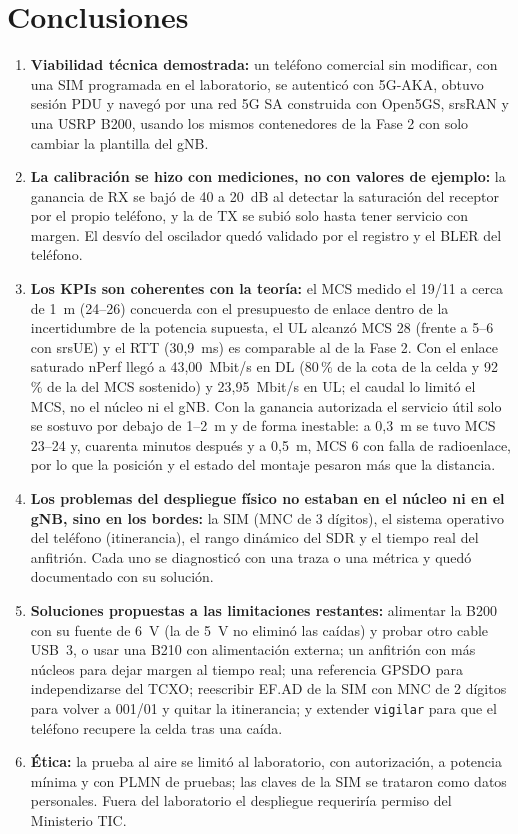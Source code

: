 \documentclass[conference]{IEEEtran}
\begin{document}
\section{Conclusiones}
\label{sec:concl}

\begin{enumerate}
  \item \textbf{Viabilidad técnica demostrada:} un teléfono comercial sin modificar, con una SIM programada en el laboratorio, se autenticó con 5G-AKA, obtuvo sesión PDU y navegó por una red 5G SA construida con Open5GS, srsRAN y una USRP B200, usando los mismos contenedores de la Fase 2 con solo cambiar la plantilla del gNB.
  \item \textbf{La calibración se hizo con mediciones, no con valores de ejemplo:} la ganancia de RX se bajó de 40 a 20~dB al detectar la saturación del receptor por el propio teléfono, y la de TX se subió solo hasta tener servicio con margen. El desvío del oscilador quedó validado por el registro y el BLER del teléfono.
  \item \textbf{Los KPIs son coherentes con la teoría:} el MCS medido el 19/11 a cerca de 1~m (24--26) concuerda con el presupuesto de enlace dentro de la incertidumbre de la potencia supuesta, el UL alcanzó MCS 28 (frente a 5--6 con srsUE) y el RTT (30{,}9~ms) es comparable al de la Fase 2. Con el enlace saturado nPerf llegó a 43{,}00~Mbit/s en DL (80\,\% de la cota de la celda y 92\,\% de la del MCS sostenido) y 23{,}95~Mbit/s en UL; el caudal lo limitó el MCS, no el núcleo ni el gNB. Con la ganancia autorizada el servicio útil solo se sostuvo por debajo de 1--2~m y de forma inestable: a 0{,}3~m se tuvo MCS 23--24 y, cuarenta minutos después y a 0{,}5~m, MCS 6 con falla de radioenlace, por lo que la posición y el estado del montaje pesaron más que la distancia.
  \item \textbf{Los problemas del despliegue físico no estaban en el núcleo ni en el gNB, sino en los bordes:} la SIM (MNC de 3 dígitos), el sistema operativo del teléfono (itinerancia), el rango dinámico del SDR y el tiempo real del anfitrión. Cada uno se diagnosticó con una traza o una métrica y quedó documentado con su solución.
  \item \textbf{Soluciones propuestas a las limitaciones restantes:} alimentar la B200 con su fuente de 6~V (la de 5~V no eliminó las caídas) y probar otro cable USB~3, o usar una B210 con alimentación externa; un anfitrión con más núcleos para dejar margen al tiempo real; una referencia GPSDO para independizarse del TCXO; reescribir EF.AD de la SIM con MNC de 2 dígitos para volver a 001/01 y quitar la itinerancia; y extender \texttt{vigilar} para que el teléfono recupere la celda tras una caída.
  \item \textbf{Ética:} la prueba al aire se limitó al laboratorio, con autorización, a potencia mínima y con PLMN de pruebas; las claves de la SIM se trataron como datos personales. Fuera del laboratorio el despliegue requeriría permiso del Ministerio TIC.
\end{enumerate}
\end{document}
